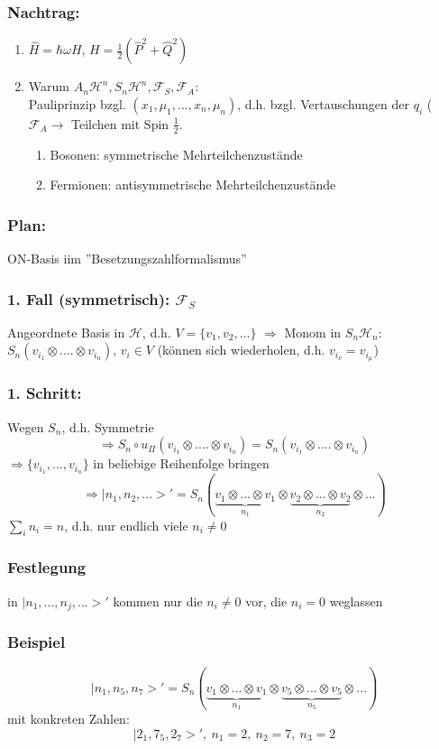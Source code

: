 \documentclass[twoside,a4paper]{scrartcl}
\renewcommand{\1}{\mathds{1}}
\newcommand{\Ra}{\Rightarrow}
\newcommand{\ra}{\rightarrow}
\renewcommand{\H}{\mathcal{H}}
\newcommand{\F}{\mathcal{F}}
\begin{document}
\subsubsection*{Nachtrag:} 
\begin{enumerate}
\item $\hat H= \hbar \omega H$, $H=\frac{1}{2}(\hat P^2+\hat Q^2)$
\item Warum $A_n\H^n, S_n\H^n, \F_S, \F_A$:\\
Pauliprinzip bzgl. $(x_1,\mu_1,...,x_n,\mu_n)$, d.h. bzgl. Vertauschungen der $q_i$ ($\F_A \ra$ Teilchen mit Spin $\frac{1}{2}$.
\begin{enumerate}
\item Bosonen: symmetrische Mehrteilchenzustände
\item Fermionen: antisymmetrische Mehrteilchenzustände
\end{enumerate}
\end{enumerate}
\subsubsection*{Plan:} 
ON-Basis iim ''Besetzungszahlformalismus''
\subsubsection*{1. Fall (symmetrisch): $\F_S$} 
 Angeordnete Basis in $\H$,  d.h. $V=\{v_1,v_2,...\}$ $\Ra$ Monom in $S_n\H_n$: $S_n(v_{i_1}\otimes .... \otimes v_{i_n})$, $v_i\in V$ (können sich wiederholen, d.h. $v_{i_\nu}=v_{i_\mu}$)
\subsubsection*{1. Schritt:} 
 Wegen $S_n$, d.h. Symmetrie 
$$\Ra S_n \circ u_\Pi(v_{i_1}\otimes .... \otimes v_{i_n})=S_n(v_{i_1}\otimes .... \otimes v_{i_n})$$
$\Ra \{v_{i_1},...,v_{i_n}\}$ in beliebige Reihenfolge bringen
$$\Ra |n_1,n_2,...>'=S_n(\underbrace {v_1\otimes ... \otimes v_1}_{n_1} \otimes \underbrace {v_2 \otimes ... \otimes v_2}_{n_2} \otimes ...)$$
$\sum_i n_i=n$, d.h. nur endlich viele $n_i \neq 0$
\subsubsection*{Festlegung} 
in $|n_1,...,n_j,...>'$ kommen nur die $n_i\neq 0$ vor, die $n_i=0$ weglassen
\subsubsection*{Beispiel} 
$$|n_1,n_5,n_7>'=S_n (\underbrace {v_1\otimes ... \otimes v_1}_{n_1} \otimes \underbrace {v_5 \otimes ... \otimes v_5}_{n_5} \otimes ...)$$
mit konkreten Zahlen:
$$|2_1,7_5,2_7>', \ n_1=2, \ n_2=7, \ n_3=2$$
\end{document}
